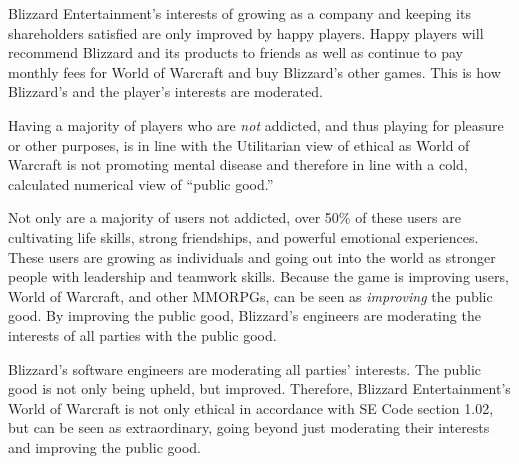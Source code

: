 \documentclass[11pt]{article}
\begin{document}
\begin{multicols}{2}
Blizzard Entertainment's interests of growing as a company and keeping its shareholders satisfied are only improved by happy players. Happy players will recommend Blizzard and its products to friends as well as continue to pay monthly fees for World of Warcraft and buy Blizzard's other games. This is how Blizzard's and the player's interests are moderated.

Having a majority of players who are \emph{not} addicted, and thus playing for pleasure or other purposes, is in line with the Utilitarian view of ethical as World of Warcraft is not promoting mental disease and therefore in line with a cold, calculated numerical view of ``public good.''

Not only are a majority of users not addicted, over 50\% of these users are cultivating life skills, strong friendships, and powerful emotional experiences. \cite{MotivationsAndDerviedExperiences} These users are growing as individuals and going out into the world as stronger people with leadership and teamwork skills. Because the game is improving users, World of Warcraft, and other MMORPGs, can be seen as \emph{improving} the public good. By improving the public good, Blizzard's engineers are moderating the interests of all parties with the public good.

Blizzard's software engineers are moderating all parties' interests. The public good is not only being upheld, but improved. Therefore, Blizzard Entertainment's World of Warcraft is not only ethical in accordance with SE Code section 1.02, but can be seen as extraordinary, going beyond just moderating their interests and improving the public good.

\end{multicols}
\newpage




\end{document}
